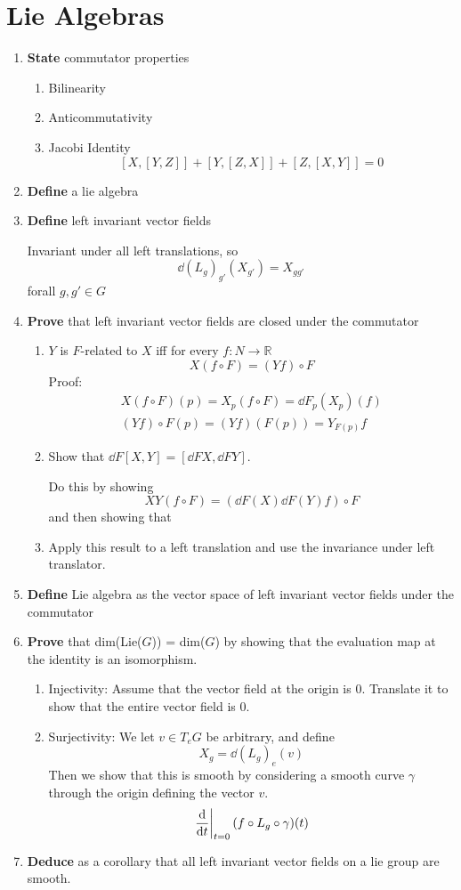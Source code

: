 \documentclass[prb,12pt]{revtex4-2}
\theoremstyle{definition}
\theoremstyle{definition}
\newcommand{\R}{\mathbb{R}}
\begin{document}
\section{Lie Algebras}
\begin{enumerate}[resume]
	\item \textbf{State} commutator properties
	\begin{enumerate}[label=(\alph*)]
		\item Bilinearity
		\item Anticommutativity
		\item Jacobi Identity
		\[[X,[Y,Z]]+[Y,[Z,X]]+[Z,[X,Y]]=0\]
	\end{enumerate}
		\item \textbf{Define} a lie algebra
	\item \textbf{Define} left invariant vector fields
	
	Invariant under all left translations, so
	\[\dd{(L_g)_{g'}}(X_{g'})=X_{gg'}\]
	forall $g,g'\in G$
	\item \textbf{Prove} that left invariant vector fields are closed under the commutator
	\begin{enumerate}[label=(\alph*)]
	\item $Y$ is $F$-related to $X$ iff for every $f:N\to \R$
	\[X(f\circ F)=(Yf)\circ F\]
	Proof:
	\begin{gather*}
		X(f\circ F)(p)=X_p(f\circ F)=\dd{F}_p(X_p)(f)\\
		(Yf)\circ F(p)=(Yf)(F(p))=Y_{F(p)}f
	\end{gather*}
	\item Show that $\dd{F}[X,Y] = [\dd{F}X,\dd{F}Y]$.
	
	Do this by showing
	\[XY(f\circ F) = (\dd{F}(X)\dd{F}(Y)f)\circ F\]
	and then showing that
	\item Apply this result to a left translation and use the invariance under left translator.
\end{enumerate}
\item \textbf{Define} Lie algebra as the vector space of left invariant vector fields under the commutator
	\item \textbf{Prove} that dim(Lie($G$)) = dim($G$) by showing that the evaluation map at the identity is an isomorphism.
	\begin{enumerate}[label=(\alph*)]
		\item Injectivity: Assume that the vector field at the origin is 0. Translate it to show that the entire vector field is 0.
		\item Surjectivity: We let $v\in T_eG$ be arbitrary, and define
		\[X_g = \dd{(L_g)_e}(v)\]
		Then we show that this is smooth by considering a smooth curve $\gamma$ through the origin defining the vector $v$.
		\[\left.\dv{t}\right|_{t=0}(f\circ L_g\circ \gamma)(t)\]
	\end{enumerate}
	\item \textbf{Deduce} as a corollary that all left invariant vector fields on a lie group are smooth.
\end{enumerate}
\end{document}
